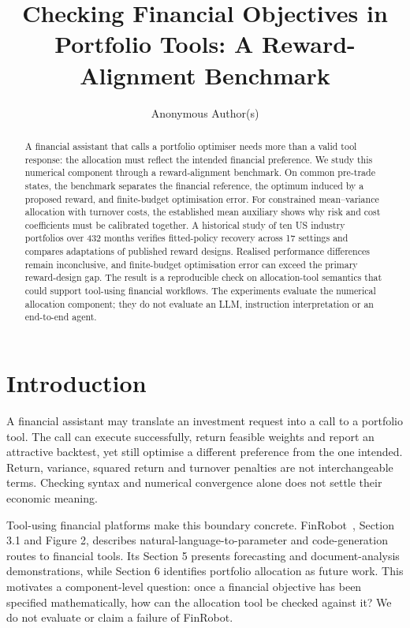 \documentclass[sigconf,anonymous,review]{acmart}
\title{Checking Financial Objectives in Portfolio Tools: A Reward-Alignment Benchmark}
\author{Anonymous Author(s)}
\begin{document}
\begin{abstract}
A financial assistant that calls a portfolio optimiser needs more than a valid tool response: the allocation must reflect the intended financial preference. We study this numerical component through a reward-alignment benchmark. On common pre-trade states, the benchmark separates the financial reference, the optimum induced by a proposed reward, and finite-budget optimisation error. For constrained mean--variance allocation with turnover costs, the established mean auxiliary shows why risk and cost coefficients must be calibrated together. A historical study of ten US industry portfolios over 432 months verifies fitted-policy recovery across 17 settings and compares adaptations of published reward designs. Realised performance differences remain inconclusive, and finite-budget optimisation error can exceed the primary reward-design gap. The result is a reproducible check on allocation-tool semantics that could support tool-using financial workflows. The experiments evaluate the numerical allocation component; they do not evaluate an LLM, instruction interpretation or an end-to-end agent.
\end{abstract}
\maketitle

\section{Introduction}
A financial assistant may translate an investment request into a call to a portfolio tool. The call can execute successfully, return feasible weights and report an attractive backtest, yet still optimise a different preference from the one intended. Return, variance, squared return and turnover penalties are not interchangeable terms. Checking syntax and numerical convergence alone does not settle their economic meaning.

Tool-using financial platforms make this boundary concrete. FinRobot\ \cite{finrobot2024}, Section 3.1 and Figure 2, describes natural-language-to-parameter and code-generation routes to financial tools. Its Section 5 presents forecasting and document-analysis demonstrations, while Section 6 identifies portfolio allocation as future work. This motivates a component-level question: once a financial objective has been specified mathematically, how can the allocation tool be checked against it? We do not evaluate or claim a failure of FinRobot.
\end{document}
